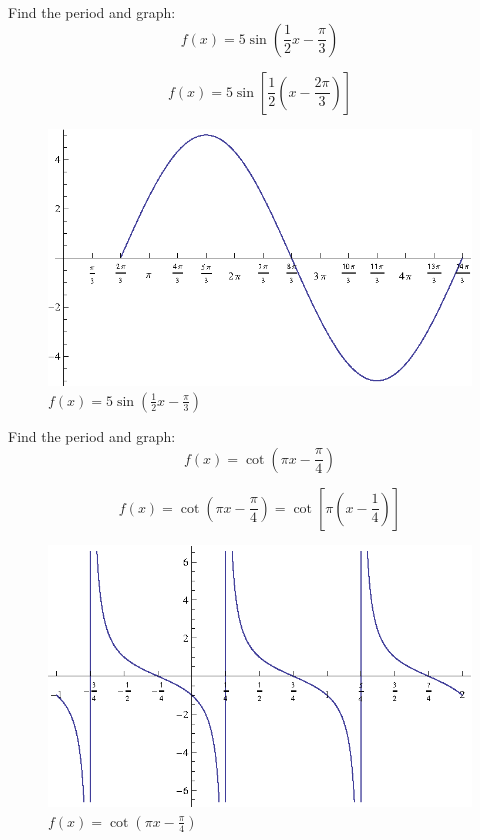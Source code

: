 \documentclass[fleqn,addpoints]{exam}
\begin{document}
\begin{questions}
    \question[10]
      Find the period and graph:
      \[
        f(x) = 5 \sin \left( \frac{1}{2} x - \frac{\pi}{3} \right)
      \]

      \begin{solution}
        \[
          f(x) = 5 \sin \left[ \frac{1}{2} \left( x - \frac{2 \pi}{3} \right) \right]
        \]

        \begin{figure}[H]
          \centering
          \includegraphics{graph1.eps}
          \caption{$f(x) = 5 \sin \left( \frac{1}{2} x - \frac{\pi}{3} \right)$}
        \end{figure}

      \end{solution}

    \question[10]
      Find the period and graph:
      \[
        f(x) = \cot \left( \pi x - \frac{\pi}{4} \right)
      \]

      \begin{solution}
        \[
          f(x) = \cot \left( \pi x - \frac{\pi}{4} \right) = \cot \left[ \pi \left( x - \frac{1}{4} \right) \right ]
        \]

        \begin{figure}[H]
          \centering
          \includegraphics{graph2.eps}
          \caption{$f(x) = \cot \left( \pi x - \frac{\pi}{4} \right)$}
        \end{figure}


\end{solution}
\end{questions}
\end{document}
